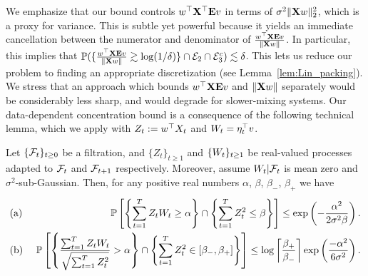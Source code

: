   We emphasize that our bound controls $w^\top \mathbf{X}^\top \mathbf{E} v$ in terms of $\sigma^2 \|\mathbf{X} w\|_2^2$, which is a proxy for variance. This is subtle yet powerful because it yields an immediate cancellation between the numerator and denominator of $ \frac{w^{\top}\mathbf{X} \mathbf{E} v}{\|\mathbf{X}w\|}$. In particular, this implies that $\mathbb{P}( \{\frac{w^{\top}\mathbf{X} \mathbf{E} v}{\|\mathbf{X}w\|} \gtrsim \log(1/\delta)\} \cap \mathcal{E}_2 \cap \mathcal{E}_3^c ) \lesssim \delta$. This lets us reduce our problem to finding an appropriate discretization (see Lemma~\ref{lem:Lin_packing}). We stress that an approach which bounds $w^{\top}\mathbf{X} \mathbf{E} v$ and $\|\mathbf{X}w\|$ separately would be considerably less sharp, and would degrade for slower-mixing systems. Our data-dependent concentration bound is a consequence of the following technical lemma, which we apply with $Z_t := w^\top X_t$ and $W_t = \eta_{t}^\top v$.
\begin{lem}\label{lem:martingale_lem} Let $\{\mathcal{F}_{t}\}_{t \ge 0}$ be a filtration, and $\{Z_t\}_{t\ge 1}$ and $\{W_t\}_{t\ge 1}$ be real-valued processes adapted to $\mathcal{F}_{t}$ and $\mathcal{F}_{t + 1}$ respectively. Moreover, assume $W_t | \mathcal{F}_{t}$ is mean zero and $\sigma^2$-sub-Gaussian.  Then, for any positive real numbers $\alpha$, $\beta$, $\beta_-$, $\beta_+$ we have
\begin{eqnarray}\label{eq:normalized}
&\mbox{(a) }& \mathbb{P}\left[ \left\{\sum_{t = 1}^T Z_t W_t  \ge \alpha\right\} \cap \left\{\sum_{t = 1}^T Z_t^2  \le \beta \right\}\right] \le \exp\left( - \frac{\alpha^2}{2 \sigma^2 \beta}\right).\\
&\mbox{(b) }& \mathbb{P}\left[\left\{\frac{\sum_{t=1}^T Z_t W_t}{\sqrt{\sum_{t=1}^T Z_t^2}} > \alpha\right\} \cap \left\{ \sum_{t=1}^TZ_t^2 \in [\beta_-,\beta_+]\right\}\right] \le \log{\left\lceil\frac{\beta_+}{\beta_-}\right\rceil}\exp\left(\frac{-\alpha^2}{6 \sigma^2}\right).
\end{eqnarray}
  \end{lem}



